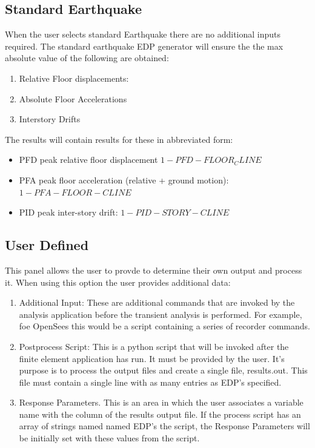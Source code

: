 \subsection{Standard Earthquake}
When the user selects standard Earthquake there are no additional inputs required. The standard earthquake EDP generator will ensure the the max absolute value of the following are obtained: \begin{enumerate}
\item Relative Floor displacements:
\item Absolute Floor Accelerations
\item Interstory Drifts
\end{enumerate}

The  results will contain results for these in abbreviated form:
\begin{itemize}
\item PFD peak relative floor displacement $1-PFD-FLOOR_CLINE$
\item PFA peak floor acceleration (relative + ground motion): $1-PFA-FLOOR-CLINE$
\item PID peak inter-story drift: $1-PID-STORY-CLINE$
\end{itemize}

\subsection{User Defined}
This panel allows the user to provde to determine their own output and process it. When using this option the user provides additional data:
\begin{enumerate}
\item Additional Input: These are additional commands that are invoked by the analysis application before the transient analysis is performed. For example, foe OpenSees this would be a script containing a series of recorder commands.
\item Postprocess Script: This is a python script that will be invoked after the finite element application has run. It must be provided by the user. It's purpose is to process the output files and create a single file, results.out. This file must contain a single line with as many entries as EDP's specified.

\item Response Parameters. This is an area in which the user associates a variable name with the column of the results output file. If the process script has an array of strings named named EDP's the script, the Response Parameters will be initially set with these values from the script.
\end{enumerate}


